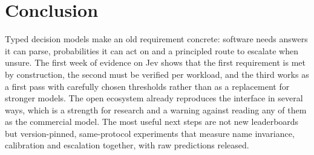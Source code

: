 \section{Conclusion}\label{sec:conclusion}

Typed decision models make an old requirement concrete: software needs answers it can parse, probabilities it can act on and a principled route to escalate when unsure. The first week of evidence on Jev shows that the first requirement is met by construction, the second must be verified per workload, and the third works as a first pass with carefully chosen thresholds rather than as a replacement for stronger models. The open ecosystem already reproduces the interface in several ways, which is a strength for research and a warning against reading any of them as the commercial model. The most useful next steps are not new leaderboards but version-pinned, same-protocol experiments that measure name invariance, calibration and escalation together, with raw predictions released.
